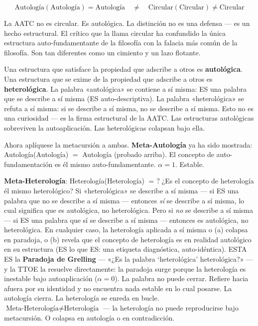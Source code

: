 \documentclass[10pt, openany, oneside]{book}
\begin{document}
$$\boxed{\text{Autología}(\text{Autología}) = \text{Autología} \quad \neq \quad \text{Circular}(\text{Circular}) \neq \text{Circular}}$$

La AATC no es circular. Es autológica. La distinción no es una defensa --- es un hecho estructural. El crítico que la llama circular ha confundido la única estructura auto-fundamentante de la filosofía con la falacia más común de la filosofía. Son tan diferentes como un cimiento y un lazo flotante.

\vspace{1.5em}

Una estructura que satisface la propiedad que adscribe a otros es \textbf{autológica}. Una estructura que se exime de la propiedad que adscribe a otros es \textbf{heterológica}. La palabra «autológica» se contiene a sí misma: ES una palabra que se describe a sí misma (ES auto-descriptiva). La palabra «heterológica» se refuta a sí misma: si se describe a sí misma, no se describe a sí misma. Esto no es una curiosidad --- es la firma estructural de la AATC. Las estructuras autológicas sobreviven la autoaplicación. Las heterológicas colapsan bajo ella.

Ahora aplíquese la metacursión a ambas. \textbf{Meta-Autología} ya ha sido mostrada: Autología(Autología) $=$ Autología (probado arriba). El concepto de auto-fundamentación es él mismo auto-fundamentante. $\alpha = 1$. Estable.

\textbf{Meta-Heterología}: Heterología(Heterología) $= \text{ ?}$\enspace ¿Es el concepto de heterología él mismo heterológico? Si «heterológica» se describe a sí misma --- si ES una palabra que no se describe a sí misma --- entonces \textit{sí} se describe a sí misma, lo cual significa que es autológica, no heterológica. Pero si \textit{no} se describe a sí misma --- si ES una palabra que sí se describe a sí misma --- entonces es autológica, no heterológica. En cualquier caso, la heterología aplicada a sí misma o (a) colapsa en paradoja, o (b) revela que el concepto de heterología es en realidad autológico en su estructura (ES lo que ES: una etiqueta diagnóstica, auto-idéntica). ESTA ES la \textbf{Paradoja de Grelling} --- «¿Es la palabra `heterológica' heterológica?» --- y la TTOE la resuelve directamente: la paradoja surge porque la heterología es inestable bajo autoaplicación ($\alpha = 0$). La palabra no puede cerrar. Refiere hacia afuera por su identidad y no encuentra nada estable en lo cual posarse. La autología cierra. La heterología se enreda en bucle. $\text{Meta-Heterología} \neq \text{Heterología}$ --- la heterología no puede reproducirse bajo metacursión. O colapsa en autología o en contradicción.
\end{document}
